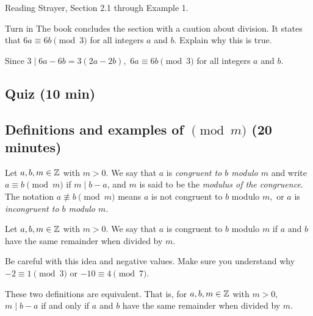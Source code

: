 \documentclass[letterpaper, 11 pt]{ximera}
\begin{document}
\begin{pre}
    \item[Reading] Strayer, Section 2.1 through Example 1.
    \item[Turn in] The book concludes the section with a caution about division. It states that $6a\equiv 6b \pmod 3$ for all integers $a$ and $b$. Explain why this is true.
    
    
    \begin{solution}
        Since $3\mid 6a-6b=3(2a-2b),$ $6a\equiv 6b \pmod 3$ for all integers $a$ and $b$.
    \end{solution}
    \end{pre}

\subsection{Quiz (10 min)}

\subsection{Definitions and examples of $\pmod m$ (20 minutes)}

\begin{defn}\label{defn:mod-divides} Let $a,b,m\in\mathbb Z$ with $m>0.$
We say that $a$ is \emph{congruent to $b$ modulo $m$} and write $a \equiv b \pmod{m}$ if $m\mid b-a$, and $m$ is said to be the \emph{modulus of the congruence}. The notation $a\not\equiv b\pmod m$ means $a$ is not congruent to $b$ modulo $m,$ or $a$ is \emph{incongruent to $b$ modulo $m$.} 
\end{defn}

\begin{defn}\label{defn:mod-remainder} Let $a,b,m\in\mathbb Z$ with $m>0.$ We say that $a$ is congruent to $b$ modulo $m$ if $a$ and $b$ have the same remainder when divided by $m$. 
\end{defn}
Be careful with this idea and negative values. Make sure you understand why $-2\equiv 1\pmod{3}$ or $-10\equiv 4\pmod{7}$.

\begin{proposition}\label{prop:mod-defn:equiv}
These two definitions are equivalent. That is, for $a,b,m\in\mathbb Z$ with $m>0,$ $m\mid b-a$ if and only if $a$ and $b$ have the same remainder when divided by $m$.
\end{proposition}
\end{document}
